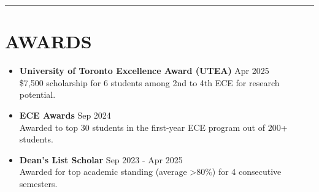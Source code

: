 \documentclass[letterpaper,10pt]{article}
\begin{document}
\noindent\rule{\linewidth}{1pt}

\section*{\textbf{AWARDS}}

\begin{itemize}[leftmargin=0.2in]
	\item \textbf{University of Toronto Excellence Award (UTEA)} \hfill Apr 2025\\
    \$7,500 scholarship for 6 students among 2nd to 4th ECE for research potential.
	\item \textbf{ECE Awards} \hfill Sep 2024\\
	Awarded to top 30 students in the first-year ECE program out of 200+ students.
	\item \textbf{Dean's List Scholar} \hfill Sep 2023 - Apr 2025\\
    Awarded for top academic standing (average \textgreater 80\%) for 4 consecutive semesters.
\end{itemize}
\end{document}
